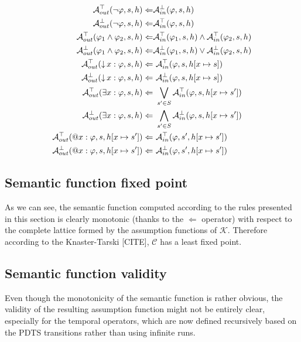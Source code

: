 \begin{align*}
	\assumeT_{out}(\neg \varphi, s, h) \Leftarrow & \assumeF_{in}(\varphi, s, h) \\
	\assumeF_{out}(\neg \varphi, s, h) \Leftarrow & \assumeT_{in}(\varphi, s, h) \\
	\assumeT_{out}(\varphi_1 \land \varphi_2, s, h) \Leftarrow & \assumeT_{in}(\varphi_1, s, h) \land \assumeT_{in}(\varphi_2, s, h) \\
	\assumeF_{out}(\varphi_1 \land \varphi_2, s, h) \Leftarrow & \assumeF_{in}(\varphi_1, s, h) \lor \assumeF_{in}(\varphi_2, s, h) \\
	\assumeT_{out}(\hctlBind{x} \varphi, s, h) \Leftarrow &\ \assumeT_{in}(\varphi, s, h[x \mapsto s]) \\
	\assumeF_{out}(\hctlBind{x} \varphi, s, h) \Leftarrow &\ \assumeF_{in}(\varphi, s, h[x \mapsto s]) \\
	\assumeT_{out}(\hctlExists{x} \varphi, s, h) \Leftarrow &\ \bigvee_{s' \in S} \assumeT_{in}(\varphi, s, h[x \mapsto s']) \\
	\assumeF_{out}(\hctlExists{x} \varphi, s, h) \Leftarrow &\ \bigwedge_{s' \in S} \assumeF_{in}(\varphi, s, h[x \mapsto s']) \\
	\assumeT_{out}(\hctlAt{x} \varphi, s, h[x \mapsto s']) \Leftarrow &\ \assumeT_{in}(\varphi, s', h[x \mapsto s']) \\
	\assumeF_{out}(\hctlAt{x} \varphi, s, h[x \mapsto s']) \Leftarrow &\ \assumeF_{in}(\varphi, s', h[x \mapsto s']) \\
\end{align*}

\subsection{Semantic function fixed point}

As we can see, the semantic function computed according to the rules presented in this section is clearly monotonic (thanks to the $\Leftarrow$ operator) with respect to the complete lattice formed by the assumption functions of $\mathcal{K}$. Therefore according to the Knaster-Tarski [CITE], $\mathcal{C}$ has a least fixed point.

\subsection{Semantic function validity}

Even though the monotonicity of the semantic function is rather obvious, the validity of the resulting assumption function might not be entirely clear, especially for the temporal operators, which are now defined recursively based on the \ac{PDTS} transitions rather than using infinite runs.


